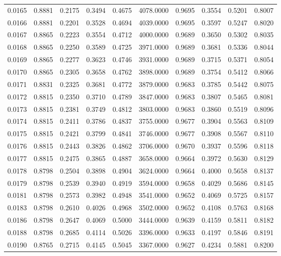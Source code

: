 \begin{tabular}{rrrrrrrrrr}
0.0165 & 0.8881 & 0.2175 & 0.3494 & 0.4675 & 4078.0000 & 0.9695 & 0.3554 & 0.5201 & 0.8007 \\
0.0166 & 0.8881 & 0.2201 & 0.3528 & 0.4694 & 4039.0000 & 0.9695 & 0.3597 & 0.5247 & 0.8020 \\
0.0167 & 0.8865 & 0.2223 & 0.3554 & 0.4712 & 4000.0000 & 0.9689 & 0.3650 & 0.5302 & 0.8035 \\
0.0168 & 0.8865 & 0.2250 & 0.3589 & 0.4725 & 3971.0000 & 0.9689 & 0.3681 & 0.5336 & 0.8044 \\
0.0169 & 0.8865 & 0.2277 & 0.3623 & 0.4746 & 3931.0000 & 0.9689 & 0.3715 & 0.5371 & 0.8054 \\
0.0170 & 0.8865 & 0.2305 & 0.3658 & 0.4762 & 3898.0000 & 0.9689 & 0.3754 & 0.5412 & 0.8066 \\
0.0171 & 0.8831 & 0.2325 & 0.3681 & 0.4772 & 3879.0000 & 0.9683 & 0.3785 & 0.5442 & 0.8075 \\
0.0172 & 0.8815 & 0.2350 & 0.3710 & 0.4789 & 3847.0000 & 0.9683 & 0.3807 & 0.5465 & 0.8081 \\
0.0173 & 0.8815 & 0.2381 & 0.3749 & 0.4812 & 3803.0000 & 0.9683 & 0.3860 & 0.5519 & 0.8096 \\
0.0174 & 0.8815 & 0.2411 & 0.3786 & 0.4837 & 3755.0000 & 0.9677 & 0.3904 & 0.5563 & 0.8109 \\
0.0175 & 0.8815 & 0.2421 & 0.3799 & 0.4841 & 3746.0000 & 0.9677 & 0.3908 & 0.5567 & 0.8110 \\
0.0176 & 0.8815 & 0.2443 & 0.3826 & 0.4862 & 3706.0000 & 0.9670 & 0.3937 & 0.5596 & 0.8118 \\
0.0177 & 0.8815 & 0.2475 & 0.3865 & 0.4887 & 3658.0000 & 0.9664 & 0.3972 & 0.5630 & 0.8129 \\
0.0178 & 0.8798 & 0.2504 & 0.3898 & 0.4904 & 3624.0000 & 0.9664 & 0.4000 & 0.5658 & 0.8137 \\
0.0179 & 0.8798 & 0.2539 & 0.3940 & 0.4919 & 3594.0000 & 0.9658 & 0.4029 & 0.5686 & 0.8145 \\
0.0181 & 0.8798 & 0.2573 & 0.3982 & 0.4948 & 3541.0000 & 0.9652 & 0.4069 & 0.5725 & 0.8157 \\
0.0183 & 0.8798 & 0.2610 & 0.4026 & 0.4968 & 3502.0000 & 0.9652 & 0.4108 & 0.5763 & 0.8168 \\
0.0186 & 0.8798 & 0.2647 & 0.4069 & 0.5000 & 3444.0000 & 0.9639 & 0.4159 & 0.5811 & 0.8182 \\
0.0188 & 0.8798 & 0.2685 & 0.4114 & 0.5026 & 3396.0000 & 0.9633 & 0.4197 & 0.5846 & 0.8191 \\
0.0190 & 0.8765 & 0.2715 & 0.4145 & 0.5045 & 3367.0000 & 0.9627 & 0.4234 & 0.5881 & 0.8200 \\

\end{tabular}
